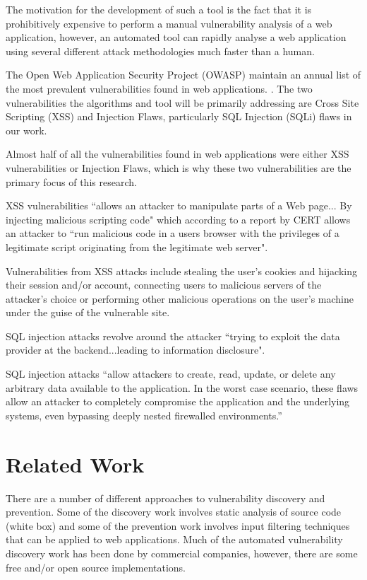 \documentclass[12pt,a4paper]{article}
\begin{document}
The motivation for the development of such a tool is the fact that it is prohibitively expensive to perform a manual vulnerability analysis of a web application, however, an automated tool can rapidly analyse a web application using several different attack methodologies much faster than a human.

The Open Web Application Security Project (OWASP) maintain an annual list of the most prevalent vulnerabilities found in web applications. \cite{OWASP:2007:Online}.  The two vulnerabilities the algorithms and tool will be primarily addressing are Cross Site Scripting (XSS) and Injection Flaws, particularly SQL Injection (SQLi) flaws in our work.

Almost half of all the vulnerabilities found in web applications were either XSS vulnerabilities or Injection Flaws, which is why these two vulnerabilities are the primary focus of this research. 

XSS vulnerabilities ``allows an attacker to manipulate parts of a Web page... By injecting malicious scripting code" \cite{Holz2006} which according to a report by CERT allows an attacker to ``run malicious code in a users browser with the privileges of a legitimate script originating from the legitimate web server". \cite{Rafail:2001:Online}

Vulnerabilities from XSS attacks include stealing the user's cookies and hijacking their session and/or account, connecting users to malicious servers of the attacker's choice or performing other malicious operations on the user's machine under the guise of the vulnerable site. \cite{Lee:2002:Online}

SQL injection attacks revolve around the attacker ``trying to exploit the data provider at the backend...leading to information disclosure". \cite{Holz2006}

SQL injection attacks “allow attackers to create, read, update, or delete any arbitrary data available to the application. In the worst case scenario, these flaws allow an attacker to completely compromise the application and the underlying systems, even bypassing deeply nested firewalled environments.” \cite{OWASP:2007:Online} 

\section{Related Work}
There are a number of different approaches to vulnerability discovery and prevention.  Some of the discovery work involves static analysis of source code (white box) and some of the prevention work involves input filtering techniques that can be applied to web applications.
Much of the automated vulnerability discovery work has been done by commercial companies, however, there are some free and/or open source implementations.
\end{document}
